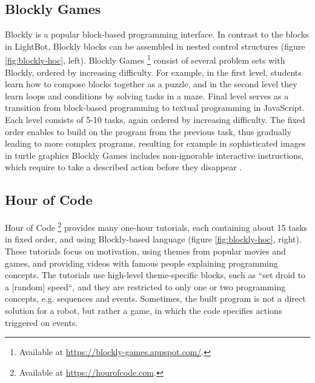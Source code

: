 \subsection{Blockly Games}
\label{sec:blockly-games}
Blockly is a popular block-based programming interface.
In contrast to the blocks in LightBot,
Blockly blocks can be assembled in nested control structures
(figure \ref{fig:blockly-hoc}, left).
Blockly Games%
\footnote{Available at \url{https://blockly-games.appspot.com/}.}
consist of several problem sets with Blockly, ordered by increasing difficulty.
For example, in the first level, students learn how to compose blocks together
as a puzzle, and in the second level they learn loops and conditions by solving
tasks in a maze. Final level serves as a transition from block-based
programming to textual programming in JavaScript.
Each level consists of 5-10 tasks, again ordered by increasing difficulty. %
The fixed order enables to build on the program from the previous task,
thus gradually leading to more complex programs,
resulting for example in sophisticated images in turtle graphics
Blockly Games includes non-ignorable interactive instructions,
which require to take a described action before they disappear
\cite{blockly-10-things}.


\subsection{Hour of Code}
\label{sec:hoc}
Hour of Code%
\footnote{Available at \url{https://hourofcode.com}.}
provides many one-hour tutorials, each containing about 15 tasks in fixed order,
and using Blockly-based language
(figure \ref{fig:blockly-hoc}, right).
These tutorials focus on motivation, using themes from popular movies and
games, and providing videos with famous people explaining programming concepts.
The tutorials use high-level theme-specific blocks, such as ``set droid to a
[random] speed``, and they are restricted to only one or two programming
concepts, e.g. sequences and events.
Sometimes, the built program is not a direct solution for a robot,
but rather a game, in which the code specifies actions triggered on events.

